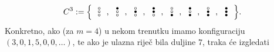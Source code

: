 \begin{equation}
\renewcommand{\arraystretch}{0.1}
    C^3:=\Bigl\{
    \begin{array}{c}
    \text\textopenbullet\\
    \text\textopenbullet\\
    \text\textopenbullet
    \end{array},
    \begin{array}{c}
    \text\textbullet\\
    \text\textopenbullet\\
    \text\textopenbullet
    \end{array},
    \begin{array}{c}
    \text\textopenbullet\\
    \text\textbullet\\
    \text\textopenbullet
    \end{array},
    \begin{array}{c}
    \text\textbullet\\
    \text\textbullet\\
    \text\textopenbullet
    \end{array},
    \begin{array}{c}
    \text\textopenbullet\\
    \text\textopenbullet\\
    \text\textbullet
    \end{array},
    \begin{array}{c}
    \text\textbullet\\
    \text\textopenbullet\\
    \text\textbullet
    \end{array},
    \begin{array}{c}
    \text\textopenbullet\\
    \text\textbullet\\
    \text\textbullet
    \end{array},
    \begin{array}{c}
    \text\textbullet\\
    \text\textbullet\\
    \text\textbullet
    \end{array}
    \Bigr\}\text.
\end{equation}
Konkretno, ako (za $m=4$) u nekom trenutku imamo konfiguraciju $(3,0,1,5,0,0,\dotsc)$, te ako je ulazna riječ bila duljine $7$, traka će izgledati
